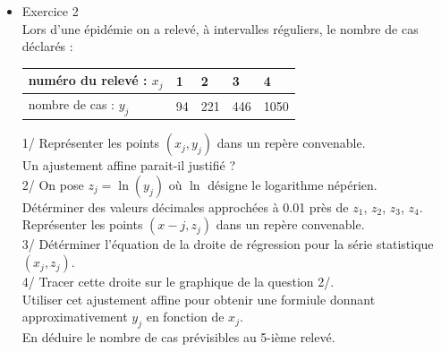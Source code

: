 \documentclass[a4paper,11pt]{book}
\begin{document}
\begin{itemize}
\item Exercice 2\\
Lors d'une \'epid\'emie on a relev\'e, \`a intervalles r\'eguliers, le nombre 
de cas d\'eclar\'es : 
\begin{center}{\tt \begin{tabular}{|l|l|l|l|l|}
\hline
num\'ero du relev\'e : $x_j$ &1&2&3&4\\
\hline
nombre de cas : $y_j$ & 94 &221 & 446 & 1050\\
\hline
\end{tabular}}\end{center}
1/ Repr\'esenter les points $(x_j,y_j)$ dans un rep\`ere convenable.\\
Un ajustement affine parait-il justifi\'e ?\\
2/ On pose $z_j=\ln(y_j)$ o\`u $\ln$ d\'esigne le logarithme n\'ep\'erien.\\
D\'et\'erminer des valeurs d\'ecimales approch\'ees \`a 0.01 pr\`es de $z_1$,
$z_2$, $z_3$, $z_4$.\\
 Repr\'esenter les points $(x-j,z_j)$ dans un rep\`ere convenable.\\
3/ D\'et\'erminer l'\'equation de la droite de r\'egression pour la s\'erie 
statistique $(x_j,z_j)$.\\
4/ Tracer cette droite sur le graphique de la question 2/.\\
Utiliser cet ajustement affine pour obtenir une formiule donnant 
approximativement $y_j$ en fonction de $x_j$.\\
En d\'eduire le nombre de cas pr\'evisibles au 5-i\`eme relev\'e.\\


\end{itemize}
\end{document}
